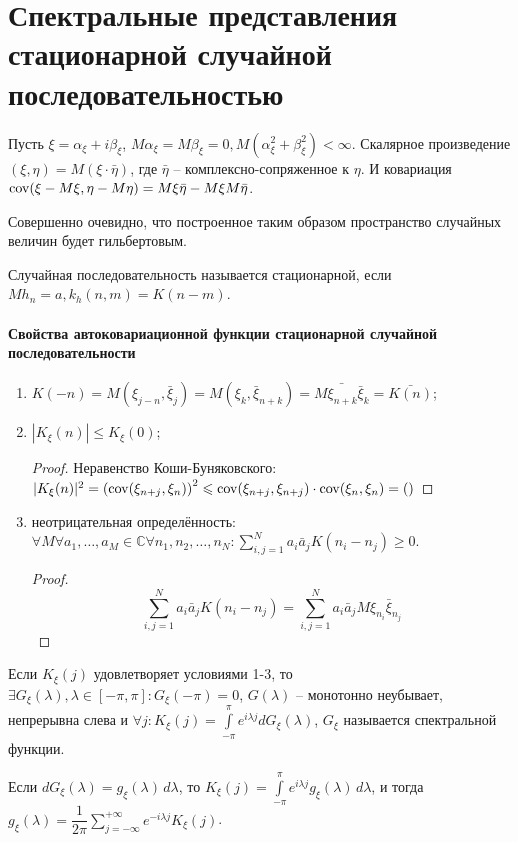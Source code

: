 \section{Спектральные представления стационарной случайной последовательностью}

Пусть $\xi = \alpha_\xi + i \beta_\xi$,
$M\alpha_\xi = M\beta_\xi = 0, M \left( \alpha_\xi^2 + \beta_\xi^2 \right) < \infty$.
Скалярное произведение $(\xi, \eta) = M(\xi \cdot \bar{\eta})$,
где $\bar{\eta}$ -- комплексно-сопряженное к $\eta$.
И ковариация $\operatorname{cov}(\xi-M\xi, \eta-M\eta) = M\xi\bar{\eta} - M\xi M\bar{\eta}$.

Совершенно очевидно, что построенное таким образом пространство случайных величин будет
гильбертовым.

\begin{definition}
  Случайная последовательность называется стационарной, если $Mh_n = a, k_h (n, m) = K(n-m)$.
\end{definition}

\paragraph{Свойства автоковариационной функции стационарной случайной последовательности}

\begin{enumerate}
  \item $K(-n) = M(\xi_{j-n}, \bar{\xi}_j) = M(\xi_k, \bar{\xi}_{n+k}) = \bar{M\xi_{n+k} \bar{\xi}_k} = \bar{K(n)}$;
  \item $|K_\xi(n)| \leqslant K_\xi(0)$;
    \begin{proof}
      Неравенство Коши-Буняковского: $|K_\xi(n)|^2 = \left( \operatorname{cov}(\xi_{n+j}, \xi_n) \right)^2 \leqslant \operatorname{cov}(\xi_{n+j}, \xi_{n+j}) \cdot \operatorname{cov}(\xi_n, \xi_n) = ()$ %
    \end{proof}

  \item неотрицательная определённость: $\forall M \forall a_1, \dots, a_M \in \mathbb{C} \forall n_1, n_2, \dots, n_N : \sum_{i, j = 1}^N a_i \bar{a}_j K(n_i - n_j) \geqslant 0$.
    \begin{proof}
      \[
        \sum_{i,j=1}^N a_i \bar{a}_j K(n_i - n_j) = \sum_{i, j=1}^N a_i \bar{a}_j M\xi_{n_i} \bar{\xi}_{n_j}
      \]
    \end{proof}
\end{enumerate}

\begin{theorem}[Герглотца]
  Если $K_\xi(j)$ удовлетворяет условиями 1-3, то $\exists G_\xi(\lambda), \lambda\in[-\pi, \pi] : G_\xi(-\pi) = 0$, $G(\lambda)$ -- монотонно неубывает, непрерывна слева и $\forall j : K_\xi(j) = \int\limits_{-\pi}^\pi e^{i\lambda j} dG_\xi(\lambda)$, $G_\xi$ называется спектральной функции.

  Если $dG_\xi(\lambda) = g_\xi(\lambda) \, d\lambda$, то $K_\xi(j) = \int\limits_{-\pi}^\pi e^{i\lambda j} g_\xi(\lambda) \, d\lambda$, и тогда $g_\xi(\lambda) = \dfrac{1}{2\pi} \sum_{j=-\infty}^{+\infty} e^{-i\lambda j} K_\xi(j)$.
\end{theorem}

